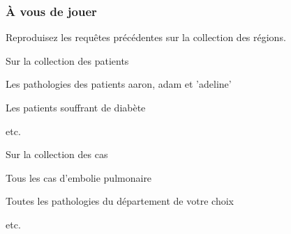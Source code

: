 \begin{frame}[fragile]
\frametitle{À vous de jouer}

Reproduisez les requêtes précédentes sur la collection des régions.

\vfill

Sur la collection des patients

\begin{redbullet}
  \item Les pathologies des patients aaron, adam et 'adeline'
  \item Les patients souffrant de diabète
  \item etc.
\end{redbullet}
\vfill

Sur la collection des cas
\begin{redbullet}
  \item Tous les cas d'embolie pulmonaire
  \item Toutes les pathologies du département de votre choix
  \item etc.
\end{redbullet}
\vfill

\end{frame}

